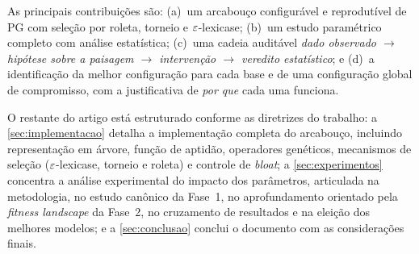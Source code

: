 As principais contribuições são: (a)~um arcabouço configurável e reprodutível
de PG com seleção por roleta, torneio e $\varepsilon$-lexicase; (b)~um estudo
paramétrico completo com análise estatística; (c)~uma cadeia auditável
\emph{dado observado $\to$ hipótese sobre a paisagem $\to$ intervenção $\to$
veredito estatístico}; e (d)~a identificação da melhor configuração para cada
base e de uma configuração global de compromisso, com a justificativa de
\emph{por que} cada uma funciona.

O restante do artigo está estruturado conforme as diretrizes do trabalho:
a \cref{sec:implementacao} detalha a implementação completa do arcabouço,
incluindo representação em árvore, função de aptidão, operadores genéticos,
mecanismos de seleção ($\varepsilon$-lexicase, torneio e roleta) e controle de
\emph{bloat}; a \cref{sec:experimentos} concentra a análise experimental do
impacto dos parâmetros, articulada na metodologia, no estudo canônico da
Fase~1, no aprofundamento orientado pela \emph{fitness landscape} da Fase~2, no
cruzamento de resultados e na eleição dos melhores modelos; e a
\cref{sec:conclusao} conclui o documento com as considerações finais.
